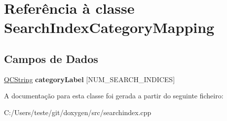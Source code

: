 \hypertarget{class_search_index_category_mapping}{\section{Referência à classe Search\-Index\-Category\-Mapping}
\label{class_search_index_category_mapping}
}
\subsection*{Campos de Dados}
\begin{DoxyCompactItemize}
\item 
\hypertarget{class_search_index_category_mapping_a5faabc6a12972e6fa3e612ca5bdc6293}{\hyperlink{class_q_c_string}{Q\-C\-String} {\bfseries category\-Label} \mbox{[}N\-U\-M\-\_\-\-S\-E\-A\-R\-C\-H\-\_\-\-I\-N\-D\-I\-C\-E\-S\mbox{]}}\label{class_search_index_category_mapping_a5faabc6a12972e6fa3e612ca5bdc6293}

\end{DoxyCompactItemize}


A documentação para esta classe foi gerada a partir do seguinte ficheiro\-:\begin{DoxyCompactItemize}
\item 
C\-:/\-Users/teste/git/doxygen/src/searchindex.\-cpp\end{DoxyCompactItemize}
